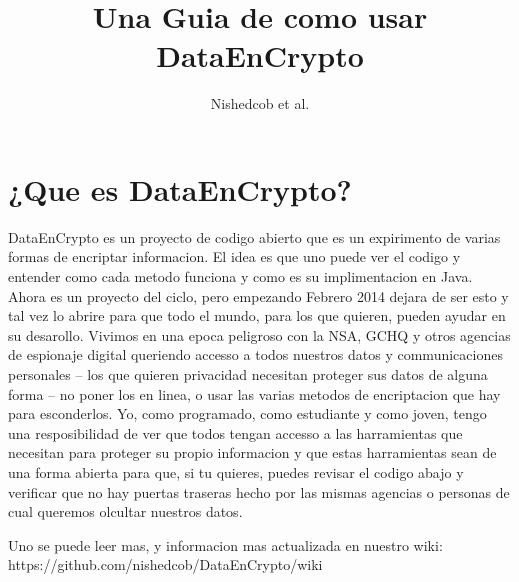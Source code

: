 \documentclass{article}
\author{Nishedcob et al.}
\title{Una Guia de como usar DataEnCrypto}
\begin{document}
	\maketitle
	\tableofcontents
	\section{¿Que es DataEnCrypto?}
		DataEnCrypto es un proyecto de codigo abierto que es un expirimento de varias formas de encriptar informacion. El idea es que uno puede ver el codigo y entender como cada metodo funciona y como es su implimentacion en Java. Ahora es un proyecto del ciclo, pero empezando Febrero 2014 dejara de ser esto y tal vez lo abrire para que todo el mundo, para los que quieren, pueden ayudar en su desarollo. Vivimos en una epoca peligroso con la NSA, GCHQ y otros agencias de espionaje digital queriendo accesso a todos nuestros datos y communicaciones personales -- los que quieren privacidad necesitan proteger sus datos de alguna forma -- no poner los en linea, o usar las varias metodos de encriptacion que hay para esconderlos. Yo, como programado, como estudiante y como joven, tengo una resposibilidad de ver que todos tengan accesso a las harramientas que necesitan para proteger su propio informacion y que estas harramientas sean de una forma abierta para que, si tu quieres, puedes revisar el codigo abajo y verificar que no hay puertas traseras hecho por las mismas agencias o personas de cual queremos olcultar nuestros datos.

		Uno se puede leer mas, y informacion mas actualizada en nuestro wiki: https://github.com/nishedcob/DataEnCrypto/wiki
\end{document}
